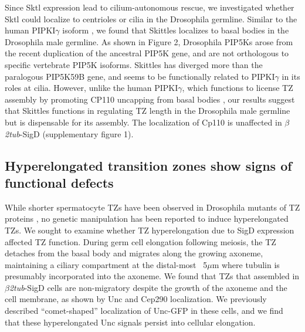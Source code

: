 \documentclass[12pt, twoside, letterpaper]{article}
\newcommand{\sigd}{$\beta$\textit{2tub}-SigD}
\begin{document}
Since Sktl expression lead to cilium-autonomous rescue,
we investigated whether Sktl could localize to centrioles or cilia in the Drosophila germline.
Similar to the human PIPKI$\gamma$ isoform \citep{xu2014pipkigamma},
we found that Skittles localizes to basal bodies in the Drosophila male germline.
As shown in Figure 2, Drosophila PIP5Ks arose from the recent duplication of
the ancestral PIP5K gene, and are not orthologous to specific vertebrate PIP5K isoforms.
Skittles has diverged more than the paralogous PIP5K59B gene, and seems
to be functionally related to PIPKI$\gamma$ in its roles at cilia.
However, unlike the human PIPKI$\gamma$, which functions to license TZ assembly
by promoting CP110 uncapping from basal bodies \citep{xu2016phosphatidylinositol},
our results suggest that Skittles functions in
regulating TZ length in the Drosophila male germline
but is dispensable for its assembly.
The localization of Cp110 is unaffected in \sigd{} (supplementary figure 1).

\subsection{Hyperelongated transition zones show signs of functional defects}
While shorter spermatocyte TZs have been observed in Drosophila mutants of TZ proteins
\citep{vieillard2016transition, pratt2016drosophila},
no genetic manipulation has been reported to induce hyperelongated TZs. 
We sought to examine whether TZ hyperelongation due to SigD expression
affected TZ function.
During germ cell elongation following meiosis, the TZ detaches from
the basal body and migrates along the growing axoneme, maintaining a ciliary compartment
at the distal-most ~5$\mu$m where tubulin is presumably incorporated into the axoneme.
We found that
TZs that assembled in \sigd{} cells are non-migratory despite the growth of the
axoneme and the cell membrane, as shown by Unc and Cep290 localization.
We previously described ``comet-shaped'' localization of Unc-GFP in these cells,
and we find that these hyperelongated Unc signals persist into cellular elongation.
\end{document}

